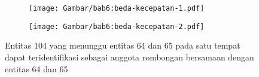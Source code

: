 \begin{figure}[h]
    \centering
    \captionsetup{width=.85\textwidth}
    \begin{subfigure}[h]{0.425\textwidth}
        \centering
        \texttt{[image: Gambar/bab6:beda-kecepatan-1.pdf]}
    \end{subfigure}
    \begin{subfigure}[h]{0.45\textwidth}
        \centering
        \texttt{[image: Gambar/bab6:beda-kecepatan-2.pdf]}
    \end{subfigure}
    \caption[Penyelesaian masalah beda kecepatan pada data CBE]{Entitas 104 yang menunggu entitas 64 dan 65 pada satu tempat dapat teridentifikasi sebagai anggota rombongan bersamaan dengan entitas 64 dan 65}
    \label{bab6:solusi-beda-kecepatan}
\end{figure}
